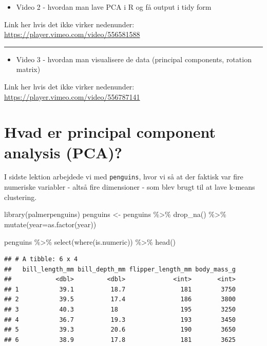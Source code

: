 \documentclass[
]{book}
\newenvironment{Shaded}{\begin{snugshade}}{\end{snugshade}}
\newcommand{\AttributeTok}[1]{\textcolor[rgb]{0.77,0.63,0.00}{#1}}
\newcommand{\FunctionTok}[1]{\textcolor[rgb]{0.00,0.00,0.00}{#1}}
\newcommand{\NormalTok}[1]{#1}
\newcommand{\OtherTok}[1]{\textcolor[rgb]{0.56,0.35,0.01}{#1}}
\newcommand{\SpecialCharTok}[1]{\textcolor[rgb]{0.00,0.00,0.00}{#1}}
\providecommand{\tightlist}{%
  \setlength{\itemsep}{0pt}\setlength{\parskip}{0pt}}
\begin{document}
\begin{itemize}
\tightlist
\item
  Video 2 - hvordan man lave PCA i R og få output i tidy form
\end{itemize}

Link her hvis det ikke virker nedenunder: \url{https://player.vimeo.com/video/556581588}

\begin{center}\rule{0.5\linewidth}{0.5pt}\end{center}

\begin{itemize}
\tightlist
\item
  Video 3 - hvordan man visualisere de data (principal components, rotation matrix)
\end{itemize}

Link her hvis det ikke virker nedenunder: \url{https://player.vimeo.com/video/556787141}

\hypertarget{hvad-er-principal-component-analysis-pca}{%
\section{Hvad er principal component analysis (PCA)?}\label{hvad-er-principal-component-analysis-pca}}

I sidste lektion arbejdede vi med \texttt{penguins}, hvor vi så at der faktisk var fire numeriske variabler - altså fire dimensioner - som blev brugt til at lave k-means clustering.

\begin{Shaded}
\begin{Highlighting}[]
\FunctionTok{library}\NormalTok{(palmerpenguins)}
\NormalTok{penguins }\OtherTok{\textless{}{-}}\NormalTok{ penguins }\SpecialCharTok{\%\textgreater{}\%} 
  \FunctionTok{drop\_na}\NormalTok{() }\SpecialCharTok{\%\textgreater{}\%}
  \FunctionTok{mutate}\NormalTok{(}\AttributeTok{year=}\FunctionTok{as.factor}\NormalTok{(year))}

\NormalTok{penguins }\SpecialCharTok{\%\textgreater{}\%} \FunctionTok{select}\NormalTok{(}\FunctionTok{where}\NormalTok{(is.numeric)) }\SpecialCharTok{\%\textgreater{}\%} \FunctionTok{head}\NormalTok{()}
\end{Highlighting}
\end{Shaded}

\begin{verbatim}
## # A tibble: 6 x 4
##   bill_length_mm bill_depth_mm flipper_length_mm body_mass_g
##            <dbl>         <dbl>             <int>       <int>
## 1           39.1          18.7               181        3750
## 2           39.5          17.4               186        3800
## 3           40.3          18                 195        3250
## 4           36.7          19.3               193        3450
## 5           39.3          20.6               190        3650
## 6           38.9          17.8               181        3625
\end{verbatim}
\end{document}
